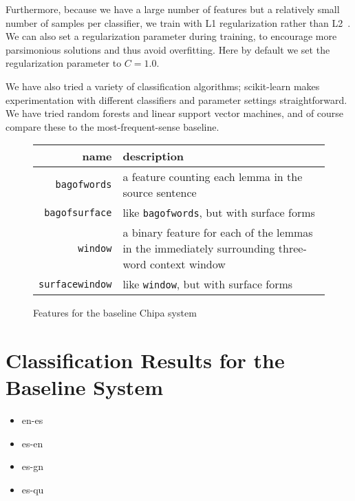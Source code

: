 Furthermore, because we have a large number of features but a relatively small
number of samples per classifier, we train with L1 regularization rather than
L2~\cite{ng2004feature}.
We can also set a regularization parameter during training, to encourage
more parsimonious solutions and thus avoid overfitting.
Here by default we set the regularization parameter to $C=1.0$.

We have also tried a variety of classification algorithms; scikit-learn makes
experimentation with different classifiers and parameter settings
straightforward. We have tried random forests and linear support vector
machines, and of course compare these to the most-frequent-sense baseline.


\begin{figure*}
  \begin{centering}
  \begin{tabular}{|r|p{11cm}|}
    \hline
    name          & description  \\
    \hline
    \texttt{bagofwords}    & a feature counting each lemma in the source sentence \\
    \hline
    \texttt{bagofsurface}  & like \texttt{bagofwords}, but with surface forms \\
    \hline
    \texttt{window}       & a binary feature for each of the lemmas in the immediately surrounding three-word context window \\
    \hline
    \texttt{surfacewindow} & like \texttt{window}, but with surface forms \\
    \hline
  \end{tabular}
  \end{centering}
  \caption{Features for the baseline Chipa system}
  \label{fig:baselinefeatures}
\end{figure*}

\section{Classification Results for the Baseline System}


\begin{itemize}
\item en-es
\item es-en
\item es-gn
\item es-qu
\end{itemize}

